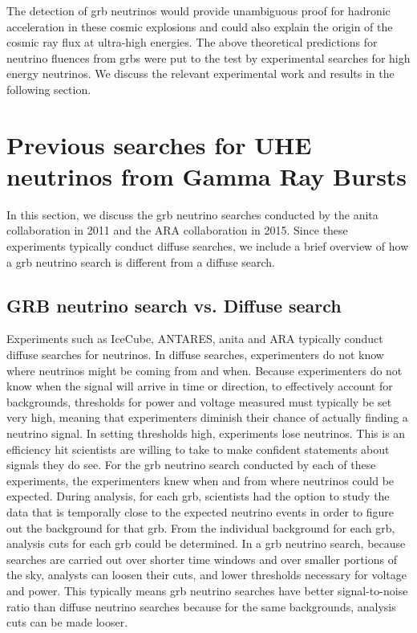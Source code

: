 The detection of \gls{grb} neutrinos would provide unambiguous proof for hadronic acceleration in these cosmic explosions and could also explain the origin of the cosmic ray flux at ultra-high energies. The above theoretical predictions for neutrino fluences from \gls{grbs} were put to the test by experimental searches for high energy neutrinos. We discuss the relevant experimental work and results in the following section.

\section{Previous searches for UHE neutrinos from Gamma Ray Bursts}

In this section, we discuss the \gls{grb} neutrino searches conducted by the \gls{anita} collaboration in 2011 and the ARA collaboration in 2015. Since these experiments typically conduct diffuse searches, we include a brief overview of how a \gls{grb} neutrino search is different from a diffuse search.

\subsection{GRB neutrino search vs. Diffuse search}
Experiments such as IceCube, ANTARES, \gls{anita} and ARA typically conduct diffuse searches for neutrinos. In diffuse searches, experimenters do not know where neutrinos might be coming from and when. Because experimenters do not know when the signal will arrive in time or direction, to effectively account for backgrounds, thresholds for power and voltage measured must typically be set very high, meaning that experimenters diminish their chance of actually finding a neutrino signal. In setting thresholds high, experiments lose neutrinos. This is an efficiency hit scientists are willing to take to make confident statements about signals they do see. For the \gls{grb} neutrino search conducted by each of these experiments, the experimenters knew when and from where neutrinos could be expected. During analysis, for each \gls{grb}, scientists had the option to study the data that is temporally close to the expected neutrino events in order to figure out the background for that \gls{grb}. From the individual background for each \gls{grb}, analysis cuts for each \gls{grb} could be determined. In a \gls{grb} neutrino search, because searches are carried out over shorter time windows and over smaller portions of the sky, analysts can loosen their cuts, and lower thresholds necessary for voltage and power. This typically means \gls{grb} neutrino searches have better signal-to-noise ratio than diffuse neutrino searches because for the same backgrounds, analysis cuts can be made looser. 


